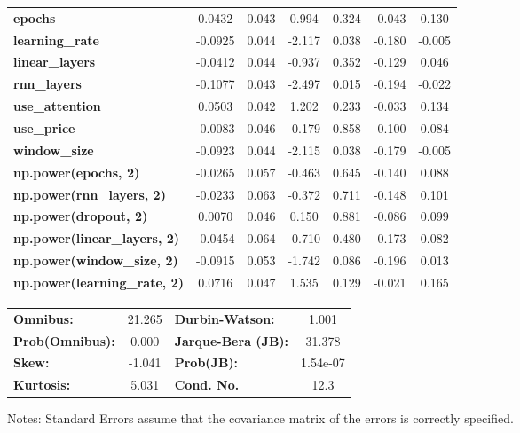 \begin{center}
\begin{tabular}{lcccccc}
\textbf{epochs}                            &       0.0432  &        0.043     &     0.994  &         0.324        &       -0.043    &        0.130     \\
\textbf{learning\_rate}                    &      -0.0925  &        0.044     &    -2.117  &         0.038        &       -0.180    &       -0.005     \\
\textbf{linear\_layers}                    &      -0.0412  &        0.044     &    -0.937  &         0.352        &       -0.129    &        0.046     \\
\textbf{rnn\_layers}                       &      -0.1077  &        0.043     &    -2.497  &         0.015        &       -0.194    &       -0.022     \\
\textbf{use\_attention}                    &       0.0503  &        0.042     &     1.202  &         0.233        &       -0.033    &        0.134     \\
\textbf{use\_price}                        &      -0.0083  &        0.046     &    -0.179  &         0.858        &       -0.100    &        0.084     \\
\textbf{window\_size}                      &      -0.0923  &        0.044     &    -2.115  &         0.038        &       -0.179    &       -0.005     \\
\textbf{np.power(epochs, 2)}               &      -0.0265  &        0.057     &    -0.463  &         0.645        &       -0.140    &        0.088     \\
\textbf{np.power(rnn\_layers, 2)}          &      -0.0233  &        0.063     &    -0.372  &         0.711        &       -0.148    &        0.101     \\
\textbf{np.power(dropout, 2)}              &       0.0070  &        0.046     &     0.150  &         0.881        &       -0.086    &        0.099     \\
\textbf{np.power(linear\_layers, 2)}       &      -0.0454  &        0.064     &    -0.710  &         0.480        &       -0.173    &        0.082     \\
\textbf{np.power(window\_size, 2)}         &      -0.0915  &        0.053     &    -1.742  &         0.086        &       -0.196    &        0.013     \\
\textbf{np.power(learning\_rate, 2)}       &       0.0716  &        0.047     &     1.535  &         0.129        &       -0.021    &        0.165     \\
\bottomrule
\end{tabular}
\begin{tabular}{lclc}
\textbf{Omnibus:}       & 21.265 & \textbf{  Durbin-Watson:     } &    1.001  \\
\textbf{Prob(Omnibus):} &  0.000 & \textbf{  Jarque-Bera (JB):  } &   31.378  \\
\textbf{Skew:}          & -1.041 & \textbf{  Prob(JB):          } & 1.54e-07  \\
\textbf{Kurtosis:}      &  5.031 & \textbf{  Cond. No.          } &     12.3  \\
\bottomrule
\end{tabular}
\end{center}

Notes: \newline
 [1] Standard Errors assume that the covariance matrix of the errors is correctly specified.